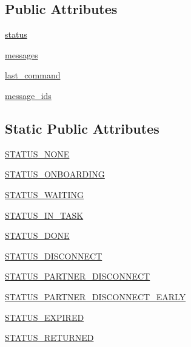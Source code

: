 \subsection*{Public Attributes}
\begin{DoxyCompactItemize}
\item 
\hyperlink{classparlai_1_1mturk_1_1core_1_1agents_1_1AssignState_a1d77495a7694cc88c937c06d4d4d039e}{status}
\item 
\hyperlink{classparlai_1_1mturk_1_1core_1_1agents_1_1AssignState_a8f08edc51460fb9ad6afc26c60e19990}{messages}
\item 
\hyperlink{classparlai_1_1mturk_1_1core_1_1agents_1_1AssignState_a055a267b03cf1ad3aed703ca83b52597}{last\+\_\+command}
\item 
\hyperlink{classparlai_1_1mturk_1_1core_1_1agents_1_1AssignState_a11bf85034efc6e223c6a58a695b022b8}{message\+\_\+ids}
\end{DoxyCompactItemize}
\subsection*{Static Public Attributes}
\begin{DoxyCompactItemize}
\item 
\hyperlink{classparlai_1_1mturk_1_1core_1_1agents_1_1AssignState_aa673fe9d783c50d8bb11675f17c76b6d}{S\+T\+A\+T\+U\+S\+\_\+\+N\+O\+NE}
\item 
\hyperlink{classparlai_1_1mturk_1_1core_1_1agents_1_1AssignState_aae951faac83afb2d56b9e9d8847a8bb2}{S\+T\+A\+T\+U\+S\+\_\+\+O\+N\+B\+O\+A\+R\+D\+I\+NG}
\item 
\hyperlink{classparlai_1_1mturk_1_1core_1_1agents_1_1AssignState_ac96604b1139e7ab8f59440439e69bb0e}{S\+T\+A\+T\+U\+S\+\_\+\+W\+A\+I\+T\+I\+NG}
\item 
\hyperlink{classparlai_1_1mturk_1_1core_1_1agents_1_1AssignState_aa97f52292ec52054eb8cc61daab7ad17}{S\+T\+A\+T\+U\+S\+\_\+\+I\+N\+\_\+\+T\+A\+SK}
\item 
\hyperlink{classparlai_1_1mturk_1_1core_1_1agents_1_1AssignState_a6526384673cb9b3129866911062fb46e}{S\+T\+A\+T\+U\+S\+\_\+\+D\+O\+NE}
\item 
\hyperlink{classparlai_1_1mturk_1_1core_1_1agents_1_1AssignState_a503af1cd6970d078b75d0bc6937046af}{S\+T\+A\+T\+U\+S\+\_\+\+D\+I\+S\+C\+O\+N\+N\+E\+CT}
\item 
\hyperlink{classparlai_1_1mturk_1_1core_1_1agents_1_1AssignState_a304961716bf89cd9717ccba5d04215b4}{S\+T\+A\+T\+U\+S\+\_\+\+P\+A\+R\+T\+N\+E\+R\+\_\+\+D\+I\+S\+C\+O\+N\+N\+E\+CT}
\item 
\hyperlink{classparlai_1_1mturk_1_1core_1_1agents_1_1AssignState_a13122d05f81503400165bba43697895a}{S\+T\+A\+T\+U\+S\+\_\+\+P\+A\+R\+T\+N\+E\+R\+\_\+\+D\+I\+S\+C\+O\+N\+N\+E\+C\+T\+\_\+\+E\+A\+R\+LY}
\item 
\hyperlink{classparlai_1_1mturk_1_1core_1_1agents_1_1AssignState_ab201305f605d06571d59c0531724f721}{S\+T\+A\+T\+U\+S\+\_\+\+E\+X\+P\+I\+R\+ED}
\item 
\hyperlink{classparlai_1_1mturk_1_1core_1_1agents_1_1AssignState_a194269122f6bab526506dc95f32bb15d}{S\+T\+A\+T\+U\+S\+\_\+\+R\+E\+T\+U\+R\+N\+ED}
\end{DoxyCompactItemize}


